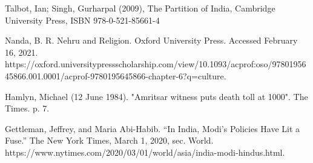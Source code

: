 \documentclass[11pt, letterpaper]{article}
\begin{document}
\begin{thebibliography}{100}
 Talbot, Ian; Singh, Gurharpal (2009), The Partition of India, Cambridge University Press, ISBN 978-0-521-85661-4

 Nanda, B. R. Nehru and Religion. Oxford University Press. Accessed February 16, 2021. https://oxford.universitypressscholarship.com/view/10.1093/acprof:oso/9780195645866.001.0001/acprof-9780195645866-chapter-6?q=culture.

 Hamlyn, Michael (12 June 1984). "Amritsar witness puts death toll at 1000". The Times. p. 7.

 Gettleman, Jeffrey, and Maria Abi-Habib. “In India, Modi’s Policies Have Lit a Fuse.” The New York Times, March 1, 2020, sec. World. https://www.nytimes.com/2020/03/01/world/asia/india-modi-hindus.html.
\end{thebibliography}
\end{document}
